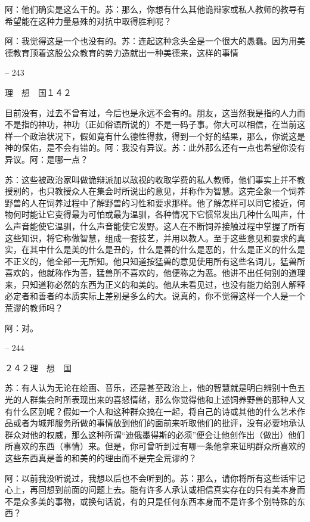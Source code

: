 \documentclass[11pt,oneside]{book}
\begin{document}
\begin{common-format}
    阿：他们确实是这么干的。苏：那么，你想有什么其他诡辩家或私人教师的教导有希望能在这种力量悬殊的对抗中取得胜利呢？

    阿：我觉得这是一个也没有的。苏：连起这种念头全是一个很大的愚蠢。因为用美德教育顶着这股公众教育的势力造就出一种美德来，这样的事情

    

-- 243

    理　想　国１４２

    目前没有，过去不曾有过，今后也是永远不会有的。朋友，这当然我是指的人力而不是指的神功，神功（正如俗语所说的）不是一码子事。你大可以相信，在当前这样一个政治状况下，假如竟有什么德性得救，得到一个好的结果，那么，你说这是神的保佑，是不会有错的。阿：我没有异议。苏：此外那么还有一点也希望你没有异议。阿：是哪一点？

    苏：这些被政治家叫做诡辩派加以敌视的收取学费的私人教师，他们事实上并不教授别的，也只教授众人在集会时所说出的意见，并称作为智慧。这完全象一个饲养野兽的人在饲养过程中了解野兽的习性和要求那样。他了解怎样可以同它接近，何物何时能让它变得最为可怕或最为温驯，各种情况下它惯常发出几种什么叫声，什么声音能使它温驯，什么声音能使它发野。这人在不断饲养接触过程中掌握了所有这些知识，将它称做智慧，组成一套技艺，并用以教人。至于这些意见和要求的真实，在其中什么是美的什么是丑的，什么是善的什么是恶的，什么是正义的什么是不正义的，他全部一无所知。他只知道按猛兽的意见使用所有这些名词儿，猛兽所喜欢的，他就称作为善，猛兽所不喜欢的，他便称之为恶。他讲不出任何别的道理来，只知道称必然的东西为正义的和美的。他从未看见过，也没有能力给别人解释必定者和善者的本质实际上差别是多么的大。说真的，你不觉得这样一个人是一个荒谬的教师吗？

    阿：对。

    

-- 244

    ２４２理　想　国

    苏：有人认为无论在绘画、音乐，还是甚至政治上，他的智慧就是明白辨别十色五光的人群集会时所表现出来的喜怒情绪，那么你觉得他和上述饲养野兽的那种人又有什么区别呢？假如一个人和这种群众搞在一起，将自己的诗或其他的什么艺术作品或者为城邦服务所做的事情放到他们的面前来听取他们的批评，没有必要地承认群众对他的权威，那么这种所谓“迪俄墨得斯的必须”便会让他创作出（做出）他们所喜欢的东西（事情）来。但是，你可曾听到过有哪一条他拿来证明群众所喜欢的这些东西真是善的和美的的理由而不是完全荒谬的？

    阿：以前我没听说过，我想以后也不会听到的。苏：那么，请你将所有这些话牢记心上，再回想到前面的问题上去。能有许多人承认或相信真实存在的只有美本身而不是众多美的事物，或换句话说，有的只是任何东西本身而不是许多个别特殊的东西？


\end{common-format}
\end{document}
